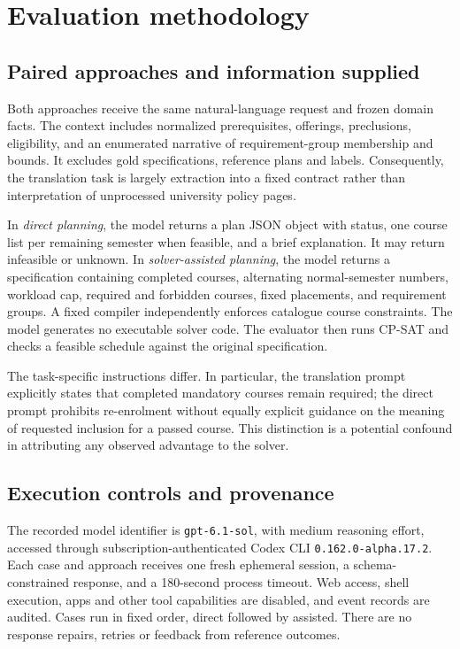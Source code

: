 \documentclass[11pt,a4paper]{article}
\newcommand{\code}[1]{\texttt{#1}}
\begin{document}
\par
\section{Evaluation methodology}
\subsection{Paired approaches and information supplied}
Both approaches receive the same natural-language request and frozen domain
facts. The context includes normalized prerequisites, offerings, preclusions,
eligibility, and an enumerated narrative of requirement-group membership
and bounds. It excludes gold specifications, reference plans and labels.
Consequently, the translation task is largely extraction into a fixed
contract rather than interpretation of unprocessed university policy pages.

In \emph{direct planning}, the model returns a plan JSON object with status,
one course list per remaining semester when feasible, and a brief explanation.
It may return infeasible or unknown. In \emph{solver-assisted planning}, the
model returns a specification containing completed courses, alternating
normal-semester numbers, workload cap, required and forbidden courses, fixed
placements, and requirement groups. A fixed compiler independently enforces
catalogue course constraints. The model generates no executable solver code.
The evaluator then runs CP-SAT and checks a feasible schedule against the
original specification.

The task-specific instructions differ. In particular, the translation prompt
explicitly states that completed mandatory courses remain required; the
direct prompt prohibits re-enrolment without equally explicit guidance on
the meaning of requested inclusion for a passed course. This distinction is
a potential confound in attributing any observed advantage to the solver.

\subsection{Execution controls and provenance}
The recorded model identifier is \code{gpt-6.1-sol}, with medium reasoning
effort, accessed through subscription-authenticated Codex CLI
\code{0.162.0-alpha.17.2}. Each case and approach receives one fresh ephemeral
session, a schema-constrained response, and a 180-second process timeout.
Web access, shell execution, apps and other tool capabilities are disabled,
and event records are audited. Cases run in fixed order, direct followed
by assisted. There are no response repairs, retries or feedback from
reference outcomes.
\end{document}
